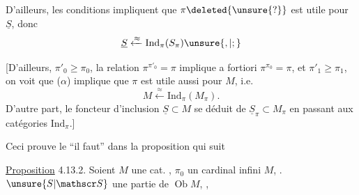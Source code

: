 D'ailleurs, les conditions  impliquent que
$\pi\deleted{\unsure{?}}$ est utile pour $\underline S$, donc
\[
 \underline S\xleftarrow{\approx}\mathrm{Ind}_\pi(S_\pi)\unsure{,|;}
\]

[D'ailleurs,  \uline{$\pi'_0\geq\pi_0$}, la relation
$\pi^{\pi'_0}=\pi$ implique a fortiori $\pi^{\pi_0}=\pi$,
et  \uline{$\pi'_1\geq\pi_1$}, on voit que
($\alpha$) implique que $\pi$ est utile aussi
pour $M$, i.e.
\[
 M\xleftarrow{\approx}\mathrm{Ind}_\pi(M_\pi).
\]
D'autre part, le foncteur d'inclusion
$\underline S\subset M$ se déduit  de $\underline S_\pi\subset M_\pi$
en passant aux catégories $\mathrm{Ind}_\pi$.]

\margin{$\unsure{\surd}$} Ceci prouve  le ``il faut'' dans la
proposition qui suit\unsure{:}

\uline{Proposition} 4.13.2. Soient $M$ une
cat. , $\pi_0$ un cardinal infini
 $M$, . $\unsure{S|\mathscr S}$ une
 partie de $\operatorname{Ob}M$, 
,

